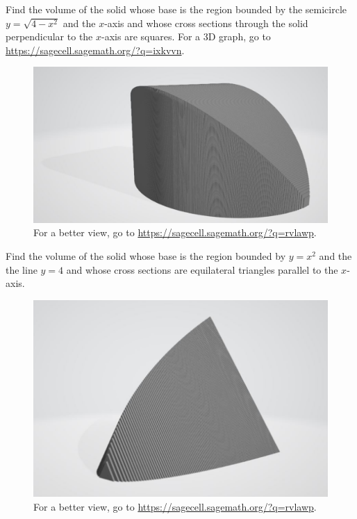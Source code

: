 \setcounter{figure}{0}
\begin{questions}

\question Find the volume of the solid whose base is the region bounded by the semicircle $y=\sqrt{4-x^2}$ and the $x$-axis and whose cross sections through the solid perpendicular to the $x$-axis are squares. For a 3D graph, go to \url{https://sagecell.sagemath.org/?q=ixkvvn}.
\begin{figure}[hbt!]\centering
  \includegraphics[scale=0.4]{plots/cross_section_squares.JPG}
  \caption{For a better view, go to \url{https://sagecell.sagemath.org/?q=rvlawp}.}
\end{figure}
\begin{solutionorbox}[6.0in]

\end{solutionorbox}

\newpage


\question Find the volume of the solid whose base is the region bounded by $y=x^2$ and the the line $y=4$ and whose cross sections are equilateral triangles parallel to the $x$-axis.
\begin{figure}[hbt!]\centering
  \includegraphics[scale=0.5]{plots/cross_section_triangles.JPG}
  \caption{For a better view, go to \url{https://sagecell.sagemath.org/?q=rvlawp}.}
\end{figure}


\end{questions}
